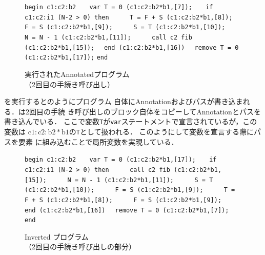 \documentclass[submit,PRO]{ipsj}
\newcommand{\blabel}[1]{\mathrm{b}#1}
\newcommand{\clabel}[1]{\mathrm{c}#1}
\def\|{\verb|}
\begin{document}
\begin{figure}[tb]
\vbox{
\hbox{\|begin c1:c2:b2|}
\hbox{\|   var T = 0 (c1:c2:b2*b1,[7]);|}
\hbox{\|   if c1:c2:i1 (N-2 > 0) then|}
\hbox{\|     T = F + S (c1:c2:b2*b1,[8]);|}
\hbox{\|     F = S (c1:c2:b2*b1,[9]);|}
\hbox{\|     S = T (c1:c2:b2*b1,[10]);|}
\hbox{\|     N = N - 1 (c1:c2:b2*b1,[11]);|}
\hbox{\|     call c2 fib (c1:c2:b2*b1,[15]);|}
\hbox{\|  end (c1:c2:b2*b1,[16])|}
\hbox{\|  remove T = 0 (c1:c2:b2*b1,[17]);|}
\hbox{\|end|}
}
\centerline{}
\caption{実行されたAnnotatedプログラム\\
（2回目の手続き呼び出し）}
\label{fig:Hexec}
\end{figure}

を実行するとのようにプログラム
自体にAnnotationおよびパスが書き込まれる．は2回目の手続
き呼び出しのブロック自体をコピーしてAnnotationとパスを書き込んでいる．
ここで変数\texttt{T}が\texttt{var}ステートメントで宣言されているが，この変数は
$\clabel{1}:\clabel{2}:\blabel{2}\ast\blabel{1}$の\texttt{T}として扱われる．
このようにして変数を宣言する際にパスを要素
に組み込むことで局所変数を実現している．

\begin{figure}[tb]
\vbox{
\hbox{\|begin c1:c2:b2|}
\hbox{\|   var T = 0 (c1:c2:b2*b1,[17]);|}
\hbox{\|   if c1:c2:i1 (N-2 > 0) then|}
\hbox{\|     call c2 fib (c1:c2:b2*b1,[15]);|}
\hbox{\|     N = N - 1 (c1:c2:b2*b1,[11]);|}
\hbox{\|     S = T (c1:c2:b2*b1,[10]);|}
\hbox{\|     F = S (c1:c2:b2*b1,[9]);|}
\hbox{\|     T = F + S (c1:c2:b2*b1,[8]);|}
\hbox{\|     F = S (c1:c2:b2*b1,[9]);|}
\hbox{\|  end (c1:c2:b2*b1,[16])|}
\hbox{\|  remove T = 0 (c1:c2:b2*b1,[7]);|}
\hbox{\|end|}
}
\centerline{}
\caption{Inverted プログラム\\
（2回目の手続き呼び出しの部分）}
\label{fig:Hinvprogram}
\end{figure}


\end{document}
